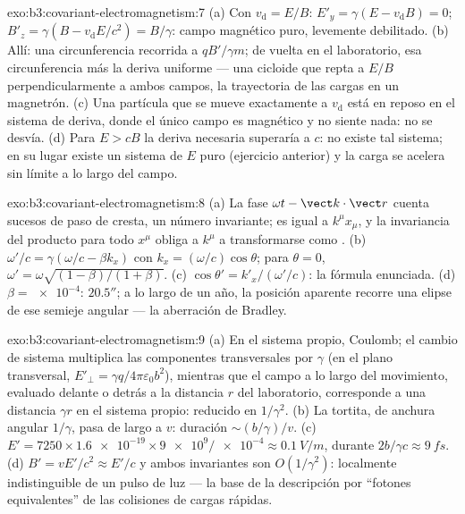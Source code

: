 \begin{solution}{exo:b3:covariant-electromagnetism:7}
(a) Con $v_{\text{d}} = E/B$: $E'_y = \gamma(E - v_{\text{d}}B) =
0$; $B'_z = \gamma(B - v_{\text{d}}E/c^2) = B/\gamma$: campo magnético puro,
levemente debilitado. (b) Allí: una circunferencia recorrida a
$qB'/\gamma m$; de vuelta en el laboratorio, esa circunferencia más la
deriva uniforme --- una cicloide que repta a $E/B$ perpendicularmente a
ambos campos, la trayectoria de las cargas en un magnetrón. (c) Una
partícula que se mueve exactamente a $v_{\text{d}}$ está en reposo en el
sistema de deriva, donde el único campo es magnético y no siente nada: no se
desvía. (d) Para $E > cB$ la deriva necesaria superaría a
$c$: no existe tal sistema; en su lugar existe un sistema de $E$ puro
(ejercicio anterior) y la carga se acelera sin límite a lo largo del campo.
\end{solution}

\begin{solution}{exo:b3:covariant-electromagnetism:8}
(a) La fase $\omega t - \vect k\cdot\vect r$ cuenta sucesos de paso de
cresta, un número invariante; es igual a $k^\mu x_\mu$, y la
invariancia del producto para todo $x^\mu$ obliga a $k^\mu$ a
transformarse como . (b) $\omega'/c = \gamma(\omega/c -
\beta k_x)$ con $k_x = (\omega/c)\cos\theta$; para $\theta = 0$,
$\omega' = \omega\sqrt{(1-\beta)/(1+\beta)}$. (c) $\cos\theta' =
k'_x/(\omega'/c)$: la fórmula enunciada. (d) $\beta = \num{e-4}$:
$20.5''$; a lo largo de un año, la posición aparente recorre una elipse de
ese semieje angular --- la aberración de Bradley.
\end{solution}

\begin{solution}{exo:b3:covariant-electromagnetism:9}
(a) En el sistema propio, Coulomb; el cambio de sistema multiplica las
componentes transversales por $\gamma$ (en el plano transversal, $E'_\perp = \gamma
q/4\pi\varepsilon_0b^2$), mientras que el campo a lo largo del movimiento,
evaluado delante o detrás a la distancia $r$ del laboratorio, corresponde a
una distancia $\gamma r$ en el sistema propio: reducido en $1/\gamma^2$.
(b) La tortita, de anchura angular $1/\gamma$, pasa de largo a $v$:
duración $\sim (b/\gamma)/v$. (c)
$E' = 7250 \times \num{1.6e-19} \times \num{9e9}/\num{e-4} \approx
\qty{0.1}{V/m}$, durante $2b/\gamma c \approx \qty{9}{fs}$. (d)
$B' = vE'/c^2 \approx E'/c$ y ambos invariantes son $O(1/\gamma^2)$:
localmente indistinguible de un pulso de luz --- la base de la descripción
por ``fotones equivalentes'' de las colisiones de cargas rápidas.
\end{solution}

